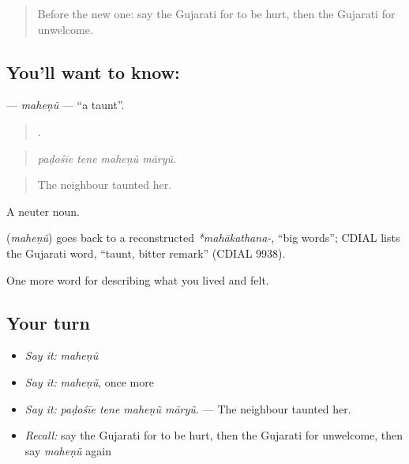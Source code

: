 \label{lesson:GU-C456-mahenu}



\begin{quote}
Before the new one: say the Gujarati for to be hurt, then the Gujarati for unwelcome.
\end{quote}

\subsection*{You'll want to know: }
\textbf{} — \emph{maheṇũ} — \textquotedblleft{}a taunt\textquotedblright{}.

\begin{quote}
   .
\end{quote}

\begin{quote}
\emph{paḍośīe tene maheṇũ māryũ.}
\end{quote}

\begin{quote}
The neighbour taunted her.
\end{quote}

A neuter noun.

\begin{cousinweb}
\textbf{} (\emph{maheṇũ}) goes back to a reconstructed \emph{*mahākathana-}, \textquotedblleft{}big words\textquotedblright{}; CDIAL lists the Gujarati word, \textquotedblleft{}taunt, bitter remark\textquotedblright{} (CDIAL 9938).
\end{cousinweb}

\begin{grammarlens}[title={What you've built}]
One more word for describing what you lived and felt.
\end{grammarlens}

\subsection*{Your turn}
\begin{itemize}
\raggedright
  \item \emph{Say it:} \emph{maheṇũ}
  \item \emph{Say it:} \emph{maheṇũ}, once more
  \item \emph{Say it:} \emph{paḍośīe tene maheṇũ māryũ.} — The neighbour taunted her.
  \item \emph{Recall:} say the Gujarati for to be hurt, then the Gujarati for unwelcome, then say \emph{maheṇũ} again
\end{itemize}

